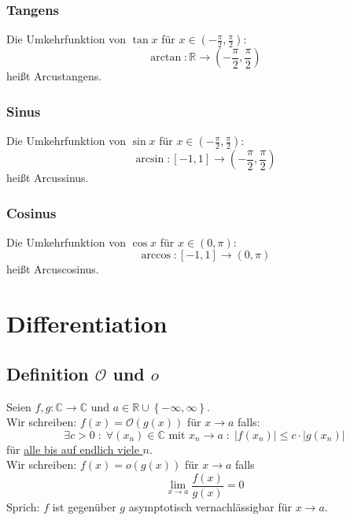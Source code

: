 \documentclass[halfparscip]{scrartcl}
\newcounter{subsection2}
\begin{document}
\subsubsection*{Tangens}
Die Umkehrfunktion von $\tan x$ für $x \in \left(-\frac{\pi}{2},\frac{\pi}{2}\right)$:
\begin{equation*}
	\arctan : \mathbb{R} \rightarrow \left(-\frac{\pi}{2},\frac{\pi}{2}\right)
\end{equation*}
heißt Arcustangens.
\subsubsection*{Sinus}
Die Umkehrfunktion von $\sin x$ für $x \in \left(-\frac{\pi}{2},\frac{\pi}{2}\right)$:
\begin{equation*}
\arcsin : \left[-1,1\right] \rightarrow \left(-\frac{\pi}{2},\frac{\pi}{2}\right)
\end{equation*}
heißt Arcussinus.
\subsubsection*{Cosinus}
Die Umkehrfunktion von $\cos x$ für $x \in \left(0,\pi\right)$:
\begin{equation*}
\arccos : \left[-1,1\right] \rightarrow \left(0,\pi\right)
\end{equation*}
heißt Arcuscosinus.\\

\newpage
\section{Differentiation}
\subsection{Definition $\mathcal{O}$ und $o$}
Seien $f,g : \mathbb{C} \rightarrow \mathbb{C}$ und $a \in \mathbb{R} \cup \left\{-\infty, \infty\right\}$.\\
Wir schreiben: $f(x) = \mathcal{O}(g(x))$ für $x \rightarrow a$ falls:
\begin{equation*}
	\exists c > 0 \;:\; \forall (x_n) \in \mathbb{C} \text{ mit } x_n \rightarrow a \;:\; \left|f(x_n)\right| \leq c \cdot \left|g(x_n)\right|
\end{equation*}
für \underline{alle bis auf endlich viele $n$}.\\
Wir schreiben: $f(x) = o(g(x))$ für $x \rightarrow a$ falls
\begin{equation*}
	\lim_{x\rightarrow a}\frac{f(x)}{g(x)} = 0
\end{equation*}
Sprich: \glqq{}$f$ ist gegenüber $g$ asymptotisch vernachlässigbar für $x \rightarrow a$.\grqq
\end{document}
